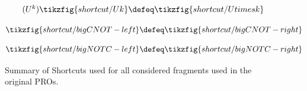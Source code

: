 \begin{figure}[ht]
{{\begin{minipage}{0.975\textwidth}
\begin{minipage}{0.32\textwidth}
    \end{minipage}
    \begin{minipage}{0.39\textwidth}
        \centering
        \begin{equation}
            \tag{$U^k$}\label{oldUk}
            \tikzfig{shortcut/Uk} \defeq \tikzfig{shortcut/Utimesk}
        \end{equation}
    \end{minipage}\vspace{-0.6em}
    \begin{minipage}{0.45\textwidth}
        \centering
        \begin{equation}
            \label{oldbigCNOT}
            \tikzfig{shortcut/bigCNOT-left} \defeq \tikzfig{shortcut/bigCNOT-right}
        \end{equation}
    \end{minipage}
    \begin{minipage}{0.45\textwidth}
        \centering
        \begin{equation}
            \label{oldbigNOTC}
            \tikzfig{shortcut/bigNOTC-left} \defeq \tikzfig{shortcut/bigNOTC-right}
        \end{equation}
    \end{minipage}
    \end{minipage}}
    }
    \caption{Summary of Shortcuts used for all considered fragments used in the original PROs.}
    \label{fig:quantum-circuit-shortcuts-pros}
\end{figure}
